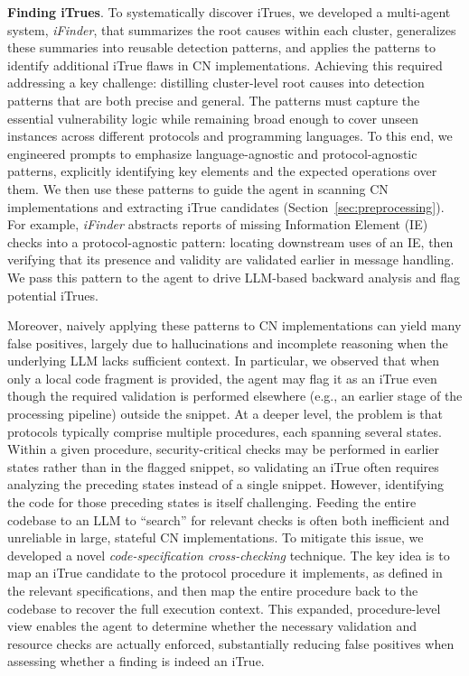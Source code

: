 \vspace{2pt}\noindent\textbf{Finding iTrues}. To systematically discover iTrues, we developed a multi-agent system, \textit{iFinder}, that summarizes the root causes within each cluster, generalizes these summaries into reusable detection patterns, and applies the patterns to identify additional iTrue flaws in CN implementations. 
Achieving this required addressing a key challenge: distilling cluster-level root causes into detection patterns that are both precise and general. The patterns must capture the essential vulnerability logic while remaining broad enough to cover unseen instances across different protocols and programming languages.
To this end, we engineered prompts to emphasize language-agnostic and protocol-agnostic patterns, explicitly identifying key elements and the expected operations over them. We then use these patterns to guide the agent in scanning CN implementations and extracting iTrue candidates (Section~\ref{sec:preprocessing}). For example, \textit{iFinder} abstracts reports of missing Information Element (IE) checks into a protocol-agnostic pattern: locating downstream uses of an IE, then verifying that its presence and validity are validated earlier in message handling. We pass this pattern to the agent to drive LLM-based backward analysis and flag potential iTrues.

Moreover, naively applying these patterns to CN implementations can yield many false positives, largely due to hallucinations and incomplete reasoning when the underlying LLM lacks sufficient context. In particular, we observed that when only a local code fragment is provided, the agent may flag it as an iTrue even though the required validation is performed elsewhere (e.g., an earlier stage of the processing pipeline) outside the snippet.
At a deeper level, the problem is that protocols typically comprise multiple procedures, each spanning several states. Within a given procedure, security-critical checks may be performed in earlier states rather than in the flagged snippet, so validating an iTrue often requires analyzing the preceding states instead of a single snippet.
However, identifying the code for those preceding states is itself challenging. Feeding the entire codebase to an LLM to ``search'' for relevant checks is often both inefficient and unreliable in large, stateful CN implementations.
To mitigate this issue, we developed a novel \textit{code-specification cross-checking} technique. 
The key idea is to map an iTrue candidate to the protocol procedure it implements, as defined in the relevant specifications, and then map the entire procedure back to the codebase to recover the full execution context. This expanded, procedure-level view enables the agent to determine whether the necessary validation and resource checks are actually enforced, substantially reducing false positives when assessing whether a finding is indeed an iTrue.

